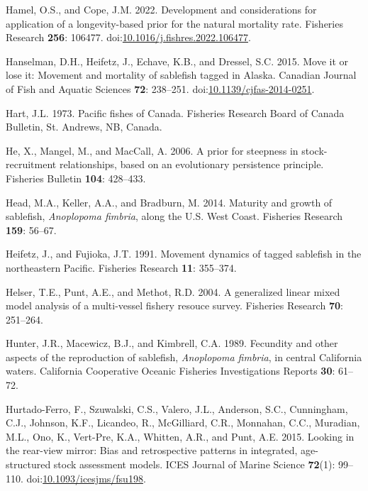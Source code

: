 \documentclass[
  english,
]{article}
\newlength{\cslhangindent}
\newenvironment{CSLReferences}[2] %
 {\begin{list}{}{%
  \setlength{\itemindent}{0pt}
  \setlength{\leftmargin}{0pt}
  \setlength{\parsep}{0pt}
  \ifodd #1
   \setlength{\leftmargin}{\cslhangindent}
   \setlength{\itemindent}{-1\cslhangindent}
  \fi
  \setlength{\itemsep}{#2\baselineskip}}}
 {\end{list}}
\begin{document}
\begin{CSLReferences}{1}{0}
Hamel, O.S., and Cope, J.M. 2022. Development and considerations for
application of a longevity-based prior for the natural mortality rate.
Fisheries Research \textbf{256}: 106477.
doi:\href{https://doi.org/10.1016/j.fishres.2022.106477}{10.1016/j.fishres.2022.106477}.

Hanselman, D.H., Heifetz, J., Echave, K.B., and Dressel, S.C. 2015. Move
it or lose it: Movement and mortality of sablefish tagged in {A}laska.
Canadian Journal of Fish and Aquatic Sciences \textbf{72}: 238--251.
doi:\href{https://doi.org/10.1139/cjfas-2014-0251}{10.1139/cjfas-2014-0251}.

Hart, J.L. 1973. Pacific fishes of {C}anada. Fisheries Research Board of
Canada Bulletin, St. Andrews, NB, Canada.

He, X., Mangel, M., and MacCall, A. 2006. A prior for steepness in
stock-recruitment relationships, based on an evolutionary persistence
principle. Fisheries Bulletin \textbf{104}: 428--433.

Head, M.A., Keller, A.A., and Bradburn, M. 2014. Maturity and growth of
sablefish, \emph{{A}noplopoma fimbria}, along the {U.S.} {W}est {C}oast.
Fisheries Research \textbf{159}: 56--67.

Heifetz, J., and Fujioka, J.T. 1991. Movement dynamics of tagged
sablefish in the northeastern {P}acific. Fisheries Research \textbf{11}:
355--374.

Helser, T.E., Punt, A.E., and Methot, R.D. 2004. A generalized linear
mixed model analysis of a multi-vessel fishery resouce survey. Fisheries
Research \textbf{70}: 251--264.

Hunter, J.R., Macewicz, B.J., and Kimbrell, C.A. 1989. Fecundity and
other aspects of the reproduction of sablefish, \emph{{A}noplopoma
fimbria}, in central {C}alifornia waters. California Cooperative Oceanic
Fisheries Investigations Reports \textbf{30}: 61--72.

Hurtado-Ferro, F., Szuwalski, C.S., Valero, J.L., Anderson, S.C.,
Cunningham, C.J., Johnson, K.F., Licandeo, R., McGilliard, C.R.,
Monnahan, C.C., Muradian, M.L., Ono, K., Vert-Pre, K.A., Whitten, A.R.,
and Punt, A.E. 2015. Looking in the rear-view mirror: Bias and
retrospective patterns in integrated, age-structured stock assessment
models. ICES Journal of Marine Science \textbf{72}(1): 99--110.
doi:\href{https://doi.org/10.1093/icesjms/fsu198}{10.1093/icesjms/fsu198}.


\end{CSLReferences}
\end{document}
